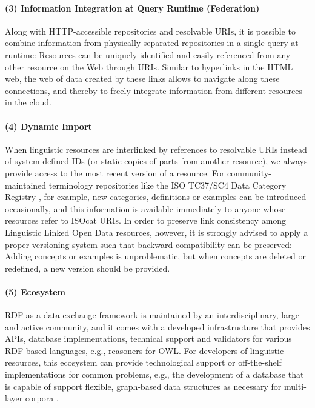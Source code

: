 \smallskip\noindent
\paragraph{(3) Information Integration at Query Runtime (Federation)}
Along with HTTP-accessible repositories and resolvable URIs, it is possible to combine information from physically separated  repositories in a single query at runtime: 
Resources can be uniquely identified and easily referenced from any other resource on the Web through URIs. 
Similar to hyperlinks in the HTML web, the web of data created by these links allows to navigate along these connections, 
and thereby to freely integrate information from different resources in the cloud.

\smallskip\noindent
\paragraph{(4) Dynamic Import}
When linguistic resources are interlinked by references to resolvable URIs instead of system-defined IDs (or static copies of parts from another resource), we always provide access to the most recent version of a resource. 
For community-maintained terminology repositories like the ISO TC37/SC4 Data Category Registry \citep[ISOcat]{wright2004global,windhouwer-wright2012}, for example, new categories, definitions or examples can be introduced occasionally, and this information is available immediately to anyone whose resources refer to ISOcat URIs. 
In order to preserve link consistency among Linguistic Linked Open Data resources, however, it is strongly advised to apply a proper versioning system such that backward-compatibility can be preserved: Adding concepts or examples is unproblematic, but when concepts are deleted %
or redefined, a new version should be provided.

\smallskip\noindent
\paragraph{(5) Ecosystem}
RDF as a data exchange framework is maintained by an interdisciplinary, large and active community, and it comes with a developed infrastructure that provides APIs, database implementations, technical support and va\-li\-da\-tors for various RDF-based languages, e.g., reasoners for OWL. For developers of linguistic resources, this ecosystem can provide technological support or off-the-shelf implementations for common problems, e.g., the de\-ve\-lop\-ment of a database that is capable of support flexible, graph-based data structures as necessary for multi-layer corpora \citep{ide-suderman07-graf}.

